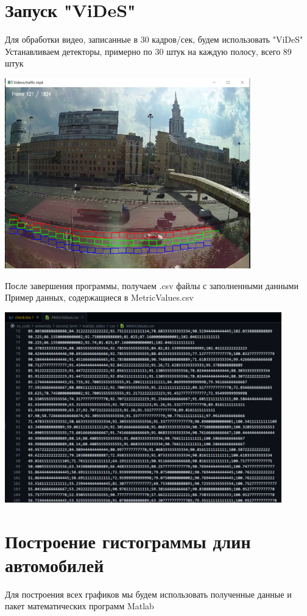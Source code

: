 \documentclass[a4paper,12pt]{article}
\begin{document}
\section*{Запуск "ViDeS"}
Для обработки видео, записанные в 30 кадров/сек, будем использовать "ViDeS"\\
Устанавливаем детекторы, примерно по 30 штук на каждую полосу, всего 89 штук
\begin{center}
\includegraphics[width=0.8\textwidth]{vides_89_detectors.jpg}
\end{center}
После завершения программы, получаем .csv файлы с заполненными данными
Пример данных, содержащиеся в MetricValues.csv
\begin{center}
\includegraphics[width=0.9\textwidth]{vides_data.jpg}
\end{center}


\newpage
\section*{Построение гистограммы длин автомобилей}
Для построения всех графиков мы будем использовать полученные данные и пакет математических программ Matlab
\end{document}
